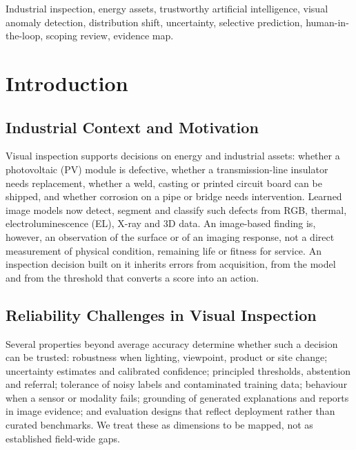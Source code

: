 \documentclass[journal]{IEEEtran}
\begin{document}
\begin{IEEEkeywords}
Industrial inspection, energy assets, trustworthy artificial intelligence, visual anomaly detection, distribution shift, uncertainty, selective prediction, human-in-the-loop, scoping review, evidence map.
\end{IEEEkeywords}

\section{Introduction}
\label{sec:introduction}

\subsection{Industrial Context and Motivation}
Visual inspection supports decisions on energy and industrial assets: whether a photovoltaic (PV) module is defective, whether a transmission-line insulator needs replacement, whether a weld, casting or printed circuit board can be shipped, and whether corrosion on a pipe or bridge needs intervention. Learned image models now detect, segment and classify such defects from RGB, thermal, electroluminescence (EL), X-ray and 3D data. An image-based finding is, however, an observation of the surface or of an imaging response, not a direct measurement of physical condition, remaining life or fitness for service. An inspection decision built on it inherits errors from acquisition, from the model and from the threshold that converts a score into an action.

\subsection{Reliability Challenges in Visual Inspection}
Several properties beyond average accuracy determine whether such a decision can be trusted: robustness when lighting, viewpoint, product or site change; uncertainty estimates and calibrated confidence; principled thresholds, abstention and referral; tolerance of noisy labels and contaminated training data; behaviour when a sensor or modality fails; grounding of generated explanations and reports in image evidence; and evaluation designs that reflect deployment rather than curated benchmarks. We treat these as dimensions to be mapped, not as established field-wide gaps.
\end{document}
